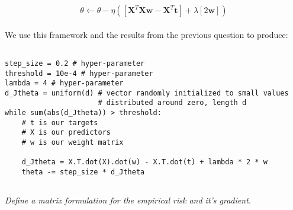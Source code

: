 \documentclass[reqno]{amsart}
\theoremstyle{definition}
\theoremstyle{remark}
\numberwithin{equation}{section}
\begin{document}
\begin{equation}
    \theta \leftarrow \theta - \eta ([\mathbf{X}^T\mathbf{Xw}-\mathbf{X}^T\mathbf{t}] + \lambda[2\mathbf{w}])
\end{equation} \\

We use this framework and the results from the previous question to produce: \\

\lstset{language=Python}
\lstset{frame=lines}
\lstset{basicstyle=\footnotesize}
\begin{lstlisting}

step_size = 0.2 # hyper-parameter
threshold = 10e-4 # hyper-parameter
lambda = 4 # hyper-parameter
d_Jtheta = uniform(d) # vector randomly initialized to small values 
                      # distributed around zero, length d
while sum(abs(d_Jtheta)) > threshold:
    # t is our targets   
    # X is our predictors
    # w is our weight matrix

    d_Jtheta = X.T.dot(X).dot(w) - X.T.dot(t) + lambda * 2 * w           
    theta -= step_size * d_Jtheta                                  

\end{lstlisting}

\subsection{}

\textit{Define a matrix formulation for the empirical risk and it's gradient. }\\


\end{document}
